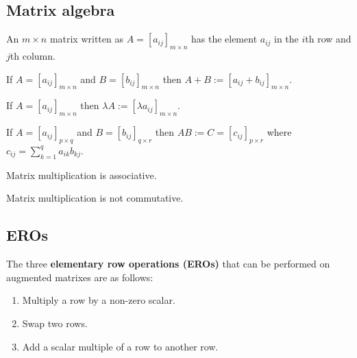 \documentclass[../Year1/Year1.tex]{subfiles}
\begin{document}
\subsection{Matrix algebra}
\begin{definition}
    An $m\times n$ matrix written as $A = [a_{ij}]_{m\times n}$ has the element $a_{ij}$ in the $i$th row and $j$th column.
\end{definition}

\begin{definition}
    If $A = [a_{ij}]_{m\times n}$ and $B = [b_{ij}]_{m\times n}$ then $A+B := [a_{ij} + b_{ij}]_{m\times n}$.
\end{definition}

\begin{definition}
    If $A = [a_{ij}]_{m\times n}$ then $\lambda A := [\lambda a_{ij}]_{m\times n}$.
\end{definition}

\begin{definition}
    If $A = [a_{ij}]_{p\times q}$ and $B = [b_{ij}]_{q\times r}$ then $AB := C = [c_{ij}]_{p\times r}$ where $c_{ij} = \sum\limits_{k=1}^qa_{ik}b_{kj}$.
\end{definition}

\begin{theorem}
    Matrix multiplication is associative.
\end{theorem}

\begin{remark}
    Matrix multiplication is not commutative.
\end{remark}

\subsection{EROs}
\begin{definition}
    The three \textbf{elementary row operations (EROs)} that can be performed on augmented matrixes are as follows:
    \begin{enumerate}
        \item Multiply a row by a non-zero scalar.
        \item Swap two rows.
        \item Add a scalar multiple of a row to another row.
    \end{enumerate}
\end{definition}
\end{document}
